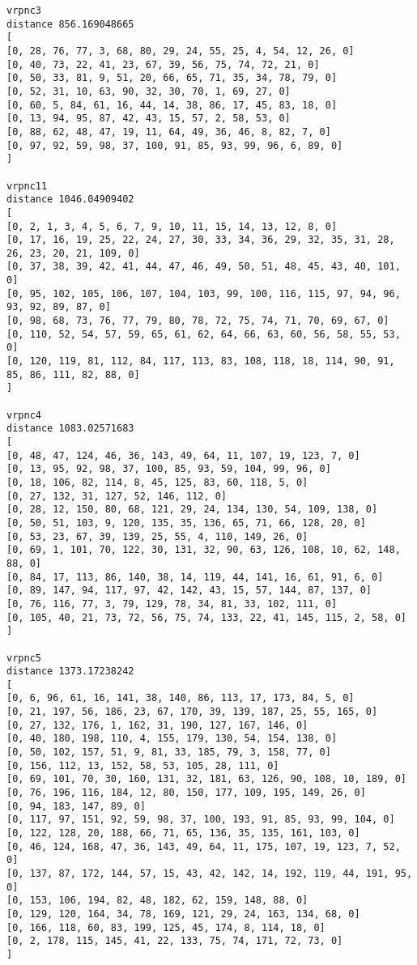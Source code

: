 \documentclass{article} %
\begin{document}
{\begin{lstlisting}[breaklines, basicstyle=\tiny]
vrpnc3
distance 856.169048665
[
[0, 28, 76, 77, 3, 68, 80, 29, 24, 55, 25, 4, 54, 12, 26, 0]
[0, 40, 73, 22, 41, 23, 67, 39, 56, 75, 74, 72, 21, 0]
[0, 50, 33, 81, 9, 51, 20, 66, 65, 71, 35, 34, 78, 79, 0]
[0, 52, 31, 10, 63, 90, 32, 30, 70, 1, 69, 27, 0]
[0, 60, 5, 84, 61, 16, 44, 14, 38, 86, 17, 45, 83, 18, 0]
[0, 13, 94, 95, 87, 42, 43, 15, 57, 2, 58, 53, 0]
[0, 88, 62, 48, 47, 19, 11, 64, 49, 36, 46, 8, 82, 7, 0]
[0, 97, 92, 59, 98, 37, 100, 91, 85, 93, 99, 96, 6, 89, 0]
]

vrpnc11
distance 1046.04909402
[
[0, 2, 1, 3, 4, 5, 6, 7, 9, 10, 11, 15, 14, 13, 12, 8, 0]
[0, 17, 16, 19, 25, 22, 24, 27, 30, 33, 34, 36, 29, 32, 35, 31, 28, 26, 23, 20, 21, 109, 0]
[0, 37, 38, 39, 42, 41, 44, 47, 46, 49, 50, 51, 48, 45, 43, 40, 101, 0]
[0, 95, 102, 105, 106, 107, 104, 103, 99, 100, 116, 115, 97, 94, 96, 93, 92, 89, 87, 0]
[0, 98, 68, 73, 76, 77, 79, 80, 78, 72, 75, 74, 71, 70, 69, 67, 0]
[0, 110, 52, 54, 57, 59, 65, 61, 62, 64, 66, 63, 60, 56, 58, 55, 53, 0]
[0, 120, 119, 81, 112, 84, 117, 113, 83, 108, 118, 18, 114, 90, 91, 85, 86, 111, 82, 88, 0]
]

vrpnc4
distance 1083.02571683
[
[0, 48, 47, 124, 46, 36, 143, 49, 64, 11, 107, 19, 123, 7, 0]
[0, 13, 95, 92, 98, 37, 100, 85, 93, 59, 104, 99, 96, 0]
[0, 18, 106, 82, 114, 8, 45, 125, 83, 60, 118, 5, 0]
[0, 27, 132, 31, 127, 52, 146, 112, 0]
[0, 28, 12, 150, 80, 68, 121, 29, 24, 134, 130, 54, 109, 138, 0]
[0, 50, 51, 103, 9, 120, 135, 35, 136, 65, 71, 66, 128, 20, 0]
[0, 53, 23, 67, 39, 139, 25, 55, 4, 110, 149, 26, 0]
[0, 69, 1, 101, 70, 122, 30, 131, 32, 90, 63, 126, 108, 10, 62, 148, 88, 0]
[0, 84, 17, 113, 86, 140, 38, 14, 119, 44, 141, 16, 61, 91, 6, 0]
[0, 89, 147, 94, 117, 97, 42, 142, 43, 15, 57, 144, 87, 137, 0]
[0, 76, 116, 77, 3, 79, 129, 78, 34, 81, 33, 102, 111, 0]
[0, 105, 40, 21, 73, 72, 56, 75, 74, 133, 22, 41, 145, 115, 2, 58, 0]
]

vrpnc5
distance 1373.17238242
[
[0, 6, 96, 61, 16, 141, 38, 140, 86, 113, 17, 173, 84, 5, 0]
[0, 21, 197, 56, 186, 23, 67, 170, 39, 139, 187, 25, 55, 165, 0]
[0, 27, 132, 176, 1, 162, 31, 190, 127, 167, 146, 0]
[0, 40, 180, 198, 110, 4, 155, 179, 130, 54, 154, 138, 0]
[0, 50, 102, 157, 51, 9, 81, 33, 185, 79, 3, 158, 77, 0]
[0, 156, 112, 13, 152, 58, 53, 105, 28, 111, 0]
[0, 69, 101, 70, 30, 160, 131, 32, 181, 63, 126, 90, 108, 10, 189, 0]
[0, 76, 196, 116, 184, 12, 80, 150, 177, 109, 195, 149, 26, 0]
[0, 94, 183, 147, 89, 0]
[0, 117, 97, 151, 92, 59, 98, 37, 100, 193, 91, 85, 93, 99, 104, 0]
[0, 122, 128, 20, 188, 66, 71, 65, 136, 35, 135, 161, 103, 0]
[0, 46, 124, 168, 47, 36, 143, 49, 64, 11, 175, 107, 19, 123, 7, 52, 0]
[0, 137, 87, 172, 144, 57, 15, 43, 42, 142, 14, 192, 119, 44, 191, 95, 0]
[0, 153, 106, 194, 82, 48, 182, 62, 159, 148, 88, 0]
[0, 129, 120, 164, 34, 78, 169, 121, 29, 24, 163, 134, 68, 0]
[0, 166, 118, 60, 83, 199, 125, 45, 174, 8, 114, 18, 0]
[0, 2, 178, 115, 145, 41, 22, 133, 75, 74, 171, 72, 73, 0]
]
\end{lstlisting}


}
\end{document}
